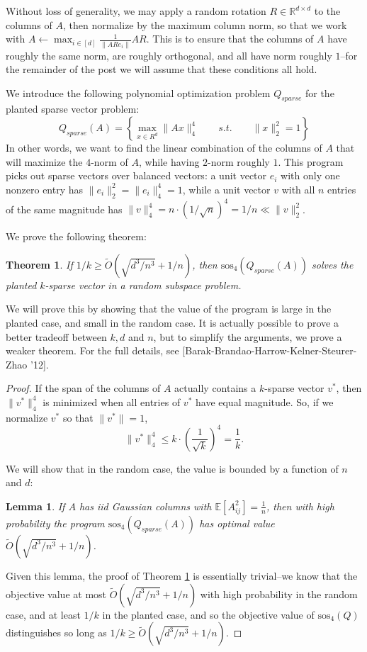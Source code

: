 \documentclass[a4paper,11pt]{article}
\newcommand{\R}{\mathbb{R}}
\newcommand{\E}{\mathbb{E}}
\newcommand{\sos}{\mathrm{sos}}
\newtheorem{theorem}{Theorem}
\newtheorem{lemma}{Lemma}
\theoremstyle{definition}
\begin{document}
Without loss of generality, we may apply a random rotation $R \in \R^{d\times d}$ to the columns of $A$, then normalize by the maximum column norm, so that we work with $A \leftarrow \max_{i\in[d]} \frac{1}{\|ARe_i\|}AR$.
This is to ensure that the columns of $A$ have roughly the same norm, are roughly orthogonal, and all have norm roughly $1$--for the remainder of the post we will assume that these conditions all hold.

We introduce the following polynomial optimization problem $Q_{sparse}$ for the planted sparse vector problem:
\[
Q_{sparse}(A) = \left\{
\max_{x \in R^d} \| Ax \|^4_4 \qquad s.t. \qquad \|x\|^2_2 = 1
\right\}
\]
In other words, we want to find the linear combination of the columns of $A$ that will maximize the $4$-norm of $A$, while having $2$-norm roughly $1$.
This program picks out sparse vectors over balanced vectors: a unit vector $e_i$ with only one nonzero entry has $\|e_i\|^2_2 = \|e_i\|^4_4 = 1$, while a unit vector $v$ with all $n$ entries of the same magnitude has $\|v\|_4^4 = n \cdot (1/\sqrt{n})^4 = 1/n \ll \|v\|_2^2$. 

We prove the following theorem:
\begin{theorem}\label{thm:plsp}
If $1/k \ge \tilde{O}(\sqrt{d^3/n^3} + 1/n)$, then $\sos_4(Q_{sparse}(A))$ solves the planted $k$-sparse vector in a random subspace problem.
\end{theorem}

We will prove this by showing that the value of the program is large in the planted case, and small in the random case.
It is actually possible to prove a better tradeoff between $k,d$ and $n$, but to simplify the arguments, we prove a weaker theorem.
For the full details, see [Barak-Brandao-Harrow-Kelner-Steurer-Zhao '12].

\begin{proof}
If the span of the columns of $A$ actually contains a $k$-sparse vector $v^*$, then $\|v^*\|_4^4$ is minimized when all entries of $v^*$ have equal magnitude. 
So, if we normalize $v^*$ so that $\|v^*\| = 1$, 
\[
\|v^*\|^4_4 \le k\cdot \left(\frac{1}{\sqrt{k}}\right)^{4} = \frac{1}{k}.
\]

We will show that in the random case, the value is bounded by a function of $n$ and $d$:
\begin{lemma}\label{lem:randomcase}
If $A$ has iid Gaussian columns with $\E[A_{ij}^2] = \frac{1}{n}$,
then with high probability the program $\sos_4(Q_{sparse}(A))$ has optimal value $\tilde{O}(\sqrt{d^3/n^3} + 1/n)$.
\end{lemma}
Given this lemma, the proof of Theorem \ref{thm:plsp} is essentially trivial--we know that the objective value at most $\tilde{O}(\sqrt{d^3/n^3} + 1/n)$ with high probability in the random case, and at least $1/k$ in the planted case, and so the objective value of $\sos_4(Q)$ distinguishes so long as $1/k \ge\tilde{O}(\sqrt{d^3/n^3} + 1/n)$.
\end{proof}
\end{document}

